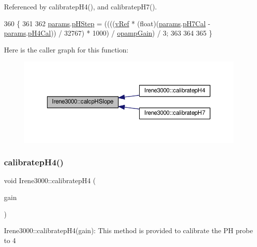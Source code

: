 Referenced by calibratep\+H4(), and calibratep\+H7().


\begin{DoxyCode}
360 \{
361 
362   \hyperlink{classIrene3000_a136585a5ee7f9ac6ab52175fa153f8e3}{params}.\hyperlink{structIrene3000_1_1parameters__T_a61cfcc2539d5f630e9071f3753aba9fe}{pHStep} = ((((\hyperlink{classIrene3000_a018e7ff9bee57e6d2b298667a668ba7e}{vRef} * (float)(\hyperlink{classIrene3000_a136585a5ee7f9ac6ab52175fa153f8e3}{params}.\hyperlink{structIrene3000_1_1parameters__T_a21265466a570d84bff914f26d2f7a03e}{pH7Cal} - 
      \hyperlink{classIrene3000_a136585a5ee7f9ac6ab52175fa153f8e3}{params}.\hyperlink{structIrene3000_1_1parameters__T_a1144de6fb54eb3e1dd2a3d8c2afc97dc}{pH4Cal})) / 32767) * 1000) / \hyperlink{classIrene3000_a4e588985ca74e5076029d5dee81034f2}{opampGain}) / 3;
363 
364  
365 \}
\end{DoxyCode}
Here is the caller graph for this function\+:\nopagebreak
\begin{figure}[H]
\begin{center}
\leavevmode
\includegraphics[width=350pt]{classIrene3000_a81f6a79e546679692053f7ac1af49613_icgraph}
\end{center}
\end{figure}
\mbox{\label{classIrene3000_a9772eeea2305fad6236a82e33e93892e}} 
\subsubsection{\texorpdfstring{calibratep\+H4()}{calibratepH4()}}
{\footnotesize\ttfamily void Irene3000\+::calibratep\+H4 (\begin{DoxyParamCaption}\item[{ads\+Gain\+\_\+t}]{gain }\end{DoxyParamCaption})}

Irene3000\+::calibratep\+H4(gain)\+: This method is provided to calibrate the PH probe to 4 


